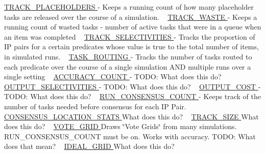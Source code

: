  \hyperlink{namespacedynamicfilterapp_1_1toggles_a2be074e9eca6d662578ca68c95050ad3}{T\+R\+A\+C\+K\+\_\+\+P\+L\+A\+C\+E\+H\+O\+L\+D\+E\+RS } -\/ Keeps a running count of how many placeholder tasks are released over the course of a simulation. ~\newline
 \hyperlink{namespacedynamicfilterapp_1_1toggles_ab80874aebf30b9d13f7928d5ecbd6ae2}{T\+R\+A\+C\+K\+\_\+\+W\+A\+S\+TE } -\/ Keeps a running count of wasted tasks -\/ number of active tasks that were in a queue when an item was completed ~\newline
 \hyperlink{namespacedynamicfilterapp_1_1toggles_acc098c8abb66db6192e90e5b54413c39}{T\+R\+A\+C\+K\+\_\+\+S\+E\+L\+E\+C\+T\+I\+V\+I\+T\+I\+ES } -\/ Tracks the proportion of IP pairs for a certain predicates whose value is true to the total number of items, in simulated runs. ~\newline
 \hyperlink{namespacedynamicfilterapp_1_1toggles_a267ac7f08878f62c6031a8fb38aa695b}{T\+A\+S\+K\+\_\+\+R\+O\+U\+T\+I\+NG } -\/ Tracks the number of tasks routed to each predicate over the course of a single simulation A\+ND multiple runs over a single setting ~\newline
 \hyperlink{namespacedynamicfilterapp_1_1toggles_ae898ca1b1c4681151406ecc2921a738b}{A\+C\+C\+U\+R\+A\+C\+Y\+\_\+\+C\+O\+U\+NT } -\/ T\+O\+DO\+: What does this do? ~\newline
 \hyperlink{namespacedynamicfilterapp_1_1toggles_ac8f124f313b63d29e1664ff5fc7a049f}{O\+U\+T\+P\+U\+T\+\_\+\+S\+E\+L\+E\+C\+T\+I\+V\+I\+T\+I\+ES } -\/ T\+O\+DO\+: What does this do? ~\newline
 \hyperlink{namespacedynamicfilterapp_1_1toggles_a2c3c37ecd0a669270751ba1fcdc0439f}{O\+U\+T\+P\+U\+T\+\_\+\+C\+O\+ST } -\/ T\+O\+DO\+: What does this do? ~\newline
 \hyperlink{namespacedynamicfilterapp_1_1toggles_ab852b5e6373777202ed3eabdf511f026}{R\+U\+N\+\_\+\+C\+O\+N\+S\+E\+N\+S\+U\+S\+\_\+\+C\+O\+U\+NT } -\/ Keeps track of the number of tasks needed before consensus for each IP Pair. ~\newline
 \hyperlink{namespacedynamicfilterapp_1_1toggles_ad7f3dbdec359eb538bf1890793d541ad}{C\+O\+N\+S\+E\+N\+S\+U\+S\+\_\+\+L\+O\+C\+A\+T\+I\+O\+N\+\_\+\+S\+T\+A\+TS } What does this do? ~\newline
 \hyperlink{namespacedynamicfilterapp_1_1toggles_a2051e4cd9bae895351ea7a73696fd815}{T\+R\+A\+C\+K\+\_\+\+S\+I\+ZE } What does this do? ~\newline
 \hyperlink{namespacedynamicfilterapp_1_1toggles_abd2acb6c03d6ca650537592475fc69e4}{V\+O\+T\+E\+\_\+\+G\+R\+ID } Draws \char`\"{}\+Vote Grids\char`\"{} from many simulations. R\+U\+N\+\_\+\+C\+O\+N\+S\+E\+N\+S\+U\+S\+\_\+\+C\+O\+U\+NT must be on. Works with accuracy. T\+O\+DO\+: What does that mean? ~\newline
 \hyperlink{namespacedynamicfilterapp_1_1toggles_a42311c82a77ac3b1c03bf7b9c6619be2}{I\+D\+E\+A\+L\+\_\+\+G\+R\+ID } What does this do? ~\newline
